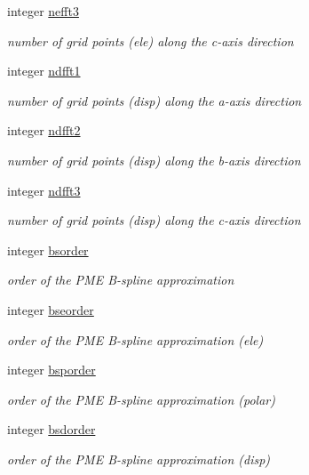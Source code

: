 \begin{DoxyCompactItemize}
integer \hyperlink{classpme_a6ddd10f469bb8e4b9f97f365df4f4a35}{nefft3}
\begin{DoxyCompactList}\small\item\em number of grid points (ele) along the c-\/axis direction \end{DoxyCompactList}\item 
integer \hyperlink{classpme_a31ece1a3fdb29bfd7938214ae845faa5}{ndfft1}
\begin{DoxyCompactList}\small\item\em number of grid points (disp) along the a-\/axis direction \end{DoxyCompactList}\item 
integer \hyperlink{classpme_a60c15d25258b6995199da60e0f7c61f9}{ndfft2}
\begin{DoxyCompactList}\small\item\em number of grid points (disp) along the b-\/axis direction \end{DoxyCompactList}\item 
integer \hyperlink{classpme_a6d6685c3953c5c0755e6351a367c1a6a}{ndfft3}
\begin{DoxyCompactList}\small\item\em number of grid points (disp) along the c-\/axis direction \end{DoxyCompactList}\item 
integer \hyperlink{classpme_a99388aa40eb079175f21e1661c522736}{bsorder}
\begin{DoxyCompactList}\small\item\em order of the P\-M\-E B-\/spline approximation \end{DoxyCompactList}\item 
integer \hyperlink{classpme_ac9f3d5f19c70ddc7c4c3bb922e176832}{bseorder}
\begin{DoxyCompactList}\small\item\em order of the P\-M\-E B-\/spline approximation (ele) \end{DoxyCompactList}\item 
integer \hyperlink{classpme_adfaef23ac8fb63bc55ee5618da503a2b}{bsporder}
\begin{DoxyCompactList}\small\item\em order of the P\-M\-E B-\/spline approximation (polar) \end{DoxyCompactList}\item 
integer \hyperlink{classpme_a186cf8382a7089c487f26bd6fda0e1a6}{bsdorder}
\begin{DoxyCompactList}\small\item\em order of the P\-M\-E B-\/spline approximation (disp) \end{DoxyCompactList}\item 

\end{DoxyCompactItemize}
